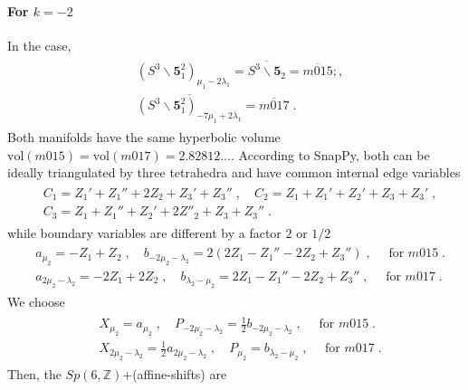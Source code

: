 \documentclass[a4paper,11pt]{article}
\begin{document}
\paragraph{For $k=-2$} In the case, 
%
\begin{align}
\begin{split}
&(S^3\backslash \mathbf{5}^2_1)_{\mu_1 - 2 \lambda_1}  = \overline{S^3 \backslash \mathbf{5}_2}= \overline{m015};,
\\
&\overline{(S^3\backslash \mathbf{5}^2_1)_{-7\mu_1 +2 \lambda_1}} = \overline{m017}\;. \label{m015/m017 from whitehead}
\end{split}
\end{align}
%
Both manifolds have the same hyperbolic volume $\textrm{vol}(m015)=\textrm{vol}(m017) = 2.82812\ldots$. 
According to SnapPy, both can be ideally triangulated by three tetrahedra and  have common internal edge variables 
%
\begin{align}
\begin{split}
&C_1 = Z_1'+Z_1''+2Z_2+Z_3'+Z_3''\;, \quad C_2 =Z_1+Z_1'+Z_2'+Z_3+Z_3'\;, 
\\
&C_3 = Z_1+Z_1''+Z_2'+2 Z''_2+Z_3+Z_3''\;.
\end{split}
\end{align}
%
while boundary variables are different by a factor $2$ or $1/2$
%
\begin{align}
\begin{split}
& a_{\mu_2}= -Z_1 +Z_2\;, \quad b_{-2 \mu_2-\lambda_2} = 2(2Z_1-Z_1''-2Z_2+Z_3'')\;,   \quad \textrm{ for $m015$}\;. 
\\
& a_{2\mu_2-\lambda_2}= -2Z_1 +2Z_2\;, \quad b_{ \lambda_2 - \mu_2} =2Z_1-Z_1''-2Z_2+Z_3''\;,   \quad \textrm{ for $m017$}\;. 
\end{split}
\end{align}
%
We choose
%
\begin{align}
\begin{split}
& X_{\mu_2}= a_{\mu_2}\;, \quad P_{-2\mu_2-\lambda_2}=\frac{1}2 b_{-2\mu_2-\lambda_2} \;,   \quad \textrm{ for $m015$}\;. 
\\
& X_{2\mu_2-\lambda_2}= \frac{1}2 a_{2\mu_2-\lambda_2}\;, \quad P_{\mu_2}= b_{\lambda_2-\mu_2} \;,   \quad \textrm{ for $m017$}\;. 
\end{split}
\end{align}
%
Then, the $Sp(6,\mathbb{Z})$+(affine-shifts) are
%
\end{document}
